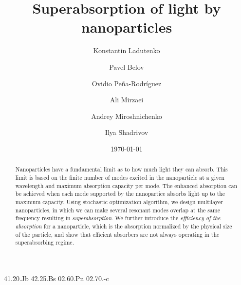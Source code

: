 \documentclass[aps,prl,twocolumn,showpacs,superscriptaddress,groupedaddress]{revtex4-1}  %
\begin{document}
 
\title{Superabsorption of light by nanoparticles}

\author{Konstantin Ladutenko} 


\author{Pavel Belov} 

\author{Ovidio Pe\~{n}a-Rodr\'{i}guez} 

\author{Ali Mirzaei} \author{Andrey Miroshnichenko} \author{Ilya
  Shadrivov} 

\date{\today}
\begin{abstract}
  Nanoparticles have a fundamental limit as to how much light they can
  absorb. This limit is based on the finite number of modes excited
  in the nanoparticle at a given wavelength and maximum absorption
  capacity per mode. The enhanced absorption can be achieved when each
  mode supported by the nanopartice absorbs light up to the maximum
  capacity. Using stochastic optimization algorithm, we design
  multilayer nanoparticles, in which we can make several resonant
  modes overlap at the same frequency resulting in {\it
    superabsorption}.  We further introduce the {\it efficiency of the
    absorption} for a nanoparticle, which is the absorption normalized
  by the physical size of the particle, and show that efficient
  absorbers are not always operating in the superabsorbing regime.
\end{abstract}


\pacs%
{41.20.Jb 42.25.Bs 02.60.Pn 02.70.-c}
\end{document}
